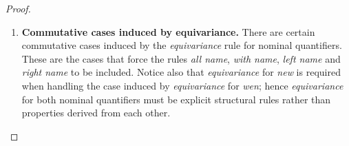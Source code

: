 \documentclass[UKenglish,acmsmall,authorversion]{acmart}
\theoremstyle{plain}
\begin{document}
{\begin{proof}
\begin{enumerate}[label=\textbf{\Alph*},ref=\Alph*,leftmargin=*]
\item \textbf{Commutative cases induced by equivariance.}
%
There are certain commutative cases induced by the \textit{equivariance} rule for nominal quantifiers.
These are the cases that force the rules \textit{all name}, \textit{with name}, \textit{left name} and \textit{right name} to be included.
Notice also that \textit{equivariance} for \textit{new} is required when handling the case induced by \textit{equivariance} for \textit{wen}; hence \textit{equivariance} for both nominal quantifiers must be explicit structural rules rather than properties derived from each other.


\end{enumerate}
\end{proof}}
\end{document}
